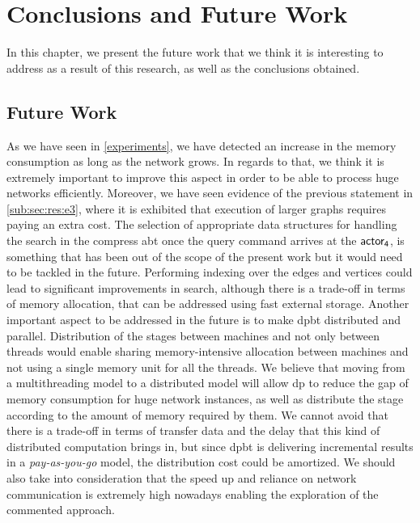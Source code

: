 \chapter{Conclusions and Future Work}\label{conclusions}
In this chapter, we present the future work that we think it is interesting to address as a result of this research, 
as well as the conclusions obtained.

\section{Future Work}
As we have seen in \autoref{experiments}, we have detected an increase in the memory consumption as long as the network grows. 
In regards to that, we think it is extremely important to improve this aspect in order to be able to process huge networks efficiently. 
Moreover, we have seen evidence of the previous statement in \autoref{sub:sec:res:e3}, where it is exhibited that execution of larger graphs requires paying an extra cost.
The selection of appropriate data structures for handling the search in the compress \acrlong{abt} once the query command arrives at the $\mathsf{actor_4}$, is something that has been out of the scope of the present work but it would need to be tackled in the future.
Performing indexing over the edges and vertices could lead to significant improvements in search, although there is a trade-off in terms of memory allocation, that can be addressed using fast external storage.
Another important aspect to be addressed in the future is to make \acrlong{dpbt} distributed and parallel. Distribution of the stages between machines and not only between threads would enable sharing memory-intensive allocation between machines and not using a single memory unit for all the threads.
We believe that moving from a multithreading model to a distributed model will allow \acrlong{dp} to reduce the gap of memory consumption for huge network instances, as well as distribute the stage according to the amount of memory required by them. 
We cannot avoid that there is a trade-off in terms of transfer data and the delay that this kind of distributed computation brings in, but since \acrlong{dpbt} is delivering incremental results in a \emph{pay-as-you-go} model, the distribution cost could be amortized. 
We should also take into consideration that the speed up and reliance on network communication is extremely high nowadays enabling the exploration of the commented approach.


